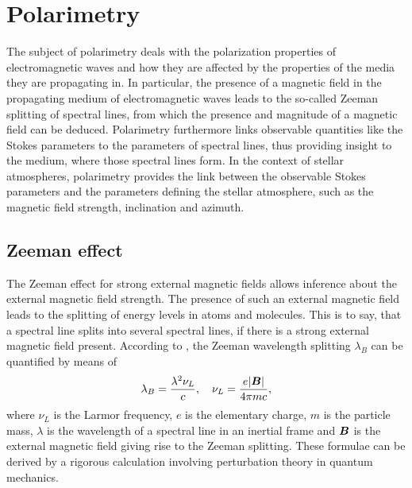 \documentclass[a4paper,12pt]{report}
\begin{document}
\section{Polarimetry}
The subject of polarimetry deals with the polarization properties of electromagnetic waves and how they are affected by the properties of the media they are propagating in. In particular, the presence of a magnetic field in the propagating medium of electromagnetic waves leads to the so-called Zeeman splitting of spectral lines, from which the presence and magnitude of a magnetic field can be deduced. Polarimetry furthermore links observable quantities like the Stokes parameters to the parameters of spectral lines, thus providing insight to the medium, where those spectral lines form. In the context of stellar atmospheres, polarimetry provides the link between the observable Stokes parameters and the parameters defining the stellar atmosphere, such as the magnetic field strength, inclination and azimuth.

\subsection{Zeeman effect}
The Zeeman effect for strong external magnetic fields allows inference about the external magnetic field strength. The presence of such an external magnetic field leads to the splitting of energy levels in atoms and molecules. This is to say, that a spectral line splits into several spectral lines, if there is a strong external magnetic field present. According to \cite[p.123]{delToroIniesta.2003}, the Zeeman wavelength splitting $\lambda_B$ can be quantified by means of \begin{equation}\label{eq:zeeman}
\lambda_B = \frac{\lambda^2 \nu_L}{c}, \quad \nu_L = \frac{e|\bm{B}|}{4\pi m c},
\end{equation} where $\nu_L$ is the Larmor frequency, $e$ is the elementary charge, $m$ is the particle mass, $\lambda$ is the wavelength of a spectral line in an inertial frame and $\bm{B}$ is the external magnetic field giving rise to the Zeeman splitting. These formulae can be derived by a rigorous calculation involving perturbation theory in quantum mechanics.
\end{document}
